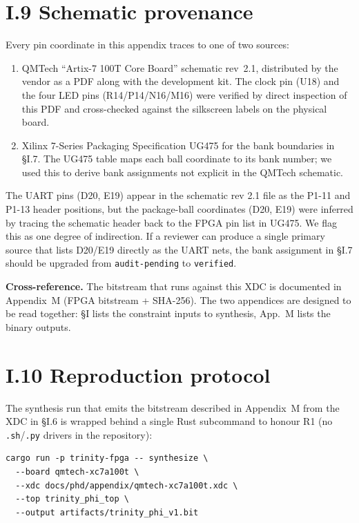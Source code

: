 \section*{I.9 Schematic provenance}
\label{sec:appI-provenance}

Every pin coordinate in this appendix traces to one of two sources:

\begin{enumerate}
  \item QMTech ``Artix-7 100T Core Board'' schematic rev~2.1, distributed
    by the vendor as a PDF along with the development kit. The clock
    pin (U18) and the four LED pins (R14/P14/N16/M16) were verified by
    direct inspection of this PDF and cross-checked against the
    silkscreen labels on the physical board.
  \item Xilinx 7-Series Packaging Specification UG475 for the bank
    boundaries in \S I.7. The UG475 table maps each ball coordinate to
    its bank number; we used this to derive bank assignments not
    explicit in the QMTech schematic.
\end{enumerate}

The UART pins (D20, E19) appear in the schematic rev 2.1 file as the
P1-11 and P1-13 header positions, but the package-ball coordinates
(D20, E19) were inferred by tracing the schematic header back to the
FPGA pin list in UG475. We flag this as one degree of indirection. If
a reviewer can produce a single primary source that lists D20/E19
directly as the UART nets, the bank assignment in \S I.7 should be
upgraded from \texttt{audit-pending} to \texttt{verified}.

\textbf{Cross-reference.} The bitstream that runs against this XDC is
documented in Appendix~M (FPGA bitstream + SHA-256). The two appendices
are designed to be read together: \S I lists the constraint inputs to
synthesis, App.~M lists the binary outputs.

\section*{I.10 Reproduction protocol}
\label{sec:appI-reproduction}

The synthesis run that emits the bitstream described in Appendix~M from
the XDC in \S I.6 is wrapped behind a single Rust subcommand to honour
R1 (no \texttt{.sh}/\texttt{.py} drivers in the repository):

\begin{verbatim}
cargo run -p trinity-fpga -- synthesize \
  --board qmtech-xc7a100t \
  --xdc docs/phd/appendix/qmtech-xc7a100t.xdc \
  --top trinity_phi_top \
  --output artifacts/trinity_phi_v1.bit
\end{verbatim}

